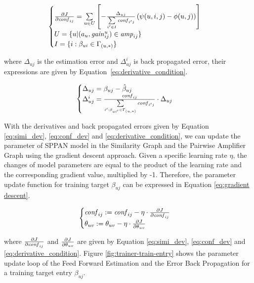 \documentclass[conference,compsoc]{IEEEtran}
\begin{document}
\begin{equation}
\label{eq:conf_dev}
\begin{cases}
\pa{J}{\confi{ij}}=\sum\limits_{u\in U} \left[ -\frac{\Delta_{uj}}{\sum\limits_{i'\in I} \confi{{i'}{j}}} \left(\psi(u,i,j) - \phi(u,j)\right) \right] \\
U=\{u|(a_u,\gain{u}{ij})\in\amp{ij}\} \\
I=\{i:\beta_{{u}{i}}\in\Gamma_{({u},*)}\}
\end{cases}
\end{equation}

where $\Delta_{uj}$ is the estimation error and
$\Delta_{uj}^{i}$ is back propagated error, their expressions are given
by Equation~\ref{eq:derivative_condition}.

\begin{equation}
\label{eq:derivative_condition}
\begin{cases}
\Delta_{uj}=\beta_{uj}-\hat{\beta}_{uj}\\
\Delta_{uj}^{i}=\frac{\confi{ij}}{\sconf{u}{i'}{j}}\cdot \Delta_{uj}
\end{cases}
\end{equation}

With the derivatives and back propagated errors given by
Equation \ref{eq:simi_dev}, \ref{eq:conf_dev} and \ref{eq:derivative_condition}, we can update the parameter of SPPAN model in the Similarity
Graph and the Pairwise Amplifier Graph using the gradient
descent approach. Given a specific learning rate $\eta$, the changes of model parameters are equal to the product of the learning rate and the
corresponding gradient value, multiplied by -1. Therefore, the parameter update function
for training target $\beta_{uj}$ can be expressed in Equation \ref{eq:gradient descent}.

\begin{equation}
\label{eq:gradient descent}
 \begin{cases}
 \confi{ij} := \confi{ij}-\eta \cdot \pa{J}{\confi{ij}}\\
 \theta_{uv} := \theta_{uv} -\eta \cdot \pa{J}{\theta_{uv}}
 \end{cases}
\end{equation}

\noindent where $\frac{\partial {J}}{\partial {\mathit{conf}_{ij}}}$ and $\frac{\partial {J}}{\partial {\theta_{uv}}}$ are
given by Equation \ref{eq:simi_dev}, \ref{eq:conf_dev} and \ref{eq:derivative_condition}. Figure \ref{fig:trainer-train-entry} shows the parameter update loop of the Feed
Forward Estimation and the Error Back Propagation for a training target entry $\beta_{uj}$.
\end{document}

